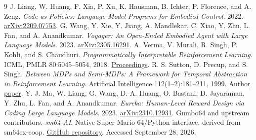 \documentclass[10pt,letterpaper]{article}
\begin{document}
\begin{thebibliography}{9}\small
{} J. Liang, W. Huang, F. Xia, P. Xu, K. Hausman, B. Ichter, P. Florence, and A. Zeng. \emph{Code as Policies: Language Model Programs for Embodied Control}. 2022. \href{https://arxiv.org/abs/2209.07753}{arXiv:2209.07753}.
 G. Wang, Y. Xie, Y. Jiang, A. Mandlekar, C. Xiao, Y. Zhu, L. Fan, and A. Anandkumar. \emph{Voyager: An Open-Ended Embodied Agent with Large Language Models}. 2023. \href{https://arxiv.org/abs/2305.16291}{arXiv:2305.16291}.
 A. Verma, V. Murali, R. Singh, P. Kohli, and S. Chaudhuri. \emph{Programmatically Interpretable Reinforcement Learning}. ICML, PMLR 80:5045--5054, 2018. \href{https://proceedings.mlr.press/v80/verma18a.html}{Proceedings}.
 R. S. Sutton, D. Precup, and S. Singh. \emph{Between MDPs and Semi-MDPs: A Framework for Temporal Abstraction in Reinforcement Learning}. Artificial Intelligence 112(1--2):181--211, 1999. \href{https://people.cs.umass.edu/~barto/courses/cs687/Sutton-Precup-Singh-AIJ99.pdf}{Author paper}.
 Y. J. Ma, W. Liang, G. Wang, D.-A. Huang, O. Bastani, D. Jayaraman, Y. Zhu, L. Fan, and A. Anandkumar. \emph{Eureka: Human-Level Reward Design via Coding Large Language Models}. 2023. \href{https://arxiv.org/abs/2310.12931}{arXiv:2310.12931}.
 Gumbo64 and upstream contributors. \emph{sm64-AI}. Native Super Mario 64/Python interface, derived from sm64ex-coop. \href{https://github.com/Gumbo64/sm64-AI}{GitHub repository}. Accessed September 28, 2026.
\end{thebibliography}
\end{document}
